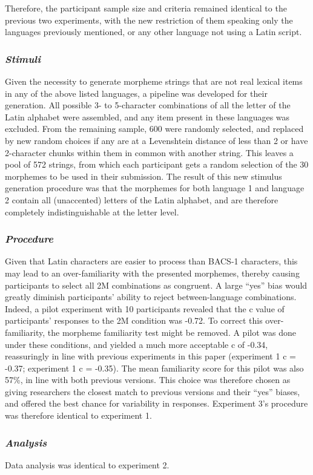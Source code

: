 Therefore, the participant sample size and criteria remained identical to the previous two experiments, with the new restriction of them speaking only the languages previously mentioned, or any other language not using a Latin script.


\subsubsection{\large{\emph{Stimuli}}}
\label{Stimuli3}

\noindent
Given the necessity to generate morpheme strings that are not real lexical items in any of the above listed languages, a pipeline was developed for their generation. All possible 3- to 5-character combinations of all the letter of the Latin alphabet were assembled, and any item present in these languages was excluded. From the remaining sample, 600 were randomly selected, and replaced by new random choices if any are at a Levenshtein distance of less than 2 or have 2-character chunks within them in common with another string. This leaves a pool of 572 strings, from which each participant gets a random selection of the 30 morphemes to be used in their submission. The result of this new stimulus generation procedure was that the morphemes for both language 1 and language 2 contain all (unaccented) letters of the Latin alphabet, and are therefore completely indistinguishable at the letter level. 


\subsubsection{\large{\emph{Procedure}}}
\label{Procedure3}

\noindent
Given that Latin characters are easier to process than BACS-1 characters, this may lead to an over-familiarity with the presented morphemes, thereby causing participants to select all 2M combinations as congruent. A large ``yes'' bias would greatly diminish participants' ability to reject between-language combinations. Indeed, a pilot experiment with 10 participants revealed that the c value of participants' responses to the 2M condition was -0.72. To correct this over-familiarity, the morpheme familiarity test might be removed. A pilot was done under these conditions, and yielded a much more acceptable c of -0.34, reassuringly in line with previous experiments in this paper (experiment 1 c = -0.37; experiment 1 c = -0.35). The mean familiarity score for this pilot was also 57\%, in line with both previous versions. This choice was therefore chosen as giving researchers the closest match to previous versions and their ``yes'' biases, and offered the best chance for variability in responses. Experiment 3's procedure was therefore identical to experiment 1.

\subsubsection{\large{\emph{Analysis}}}
\label{Analysis3}

\noindent
Data analysis was identical to experiment 2. 